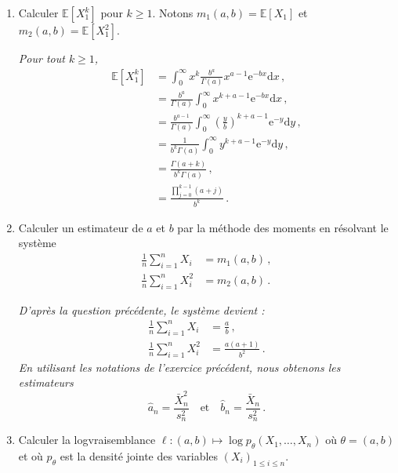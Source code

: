 \documentclass[a4paper,10pt,fleqn]{article}
\newcommand{\1}{\ensuremath{\mathbbm{1}}}
\begin{document}
\begin{enumerate}
\item Calculer $\mathbb{E}[X_1^k]$ pour $k\geq 1$. Notons $m_1(a,b) = \mathbb{E}[X_1]$ et $m_2(a,b) = \mathbb{E}[X^2_1]$.

\vspace{.2cm}

{\em Pour tout $k\geq 1$,
\begin{align*}
\mathbb{E}[X_1^k] &= \int_0^\infty x^k \frac{b^a}{\Gamma(a)}x^{a-1}\mathrm{e}^{-b x} \mathrm{d} x\,,\\
&= \frac{b^a}{\Gamma(a)}\int_0^\infty x^{k+a-1}\mathrm{e}^{-b x} \mathrm{d} x\,,\\
&= \frac{b^{a-1}}{\Gamma(a)}\int_0^\infty \left(\frac{y}{b}\right)^{k+a-1}\mathrm{e}^{-y} \mathrm{d} y\,,\\
&= \frac{1}{b^k\Gamma(a)}\int_0^\infty y^{k+a-1}\mathrm{e}^{-y} \mathrm{d} y\,,\\
&= \frac{\Gamma(a+k)}{b^k\Gamma(a)}\,,\\
&= \frac{\prod_{j=0}^{k-1}(a+j)}{b^k}\,.
\end{align*}}

 \item Calculer un estimateur de $a$ et $b$ par la m\'ethode des moments en r\'esolvant le syst\`eme
\begin{align*}
\frac{1}{n}\sum_{i=1}^nX_i &= m_1(a,b) \,,\\
\frac{1}{n}\sum_{i=1}^nX^2_i &= m_2(a,b) \,.
\end{align*}

\vspace{.2cm}

{\em D'apr\`es la question pr\'ec\'edente, le syst\`eme devient :
\begin{align*}
\frac{1}{n}\sum_{i=1}^nX_i &= \frac{a}{b}\,,\\
\frac{1}{n}\sum_{i=1}^nX^2_i &= \frac{a(a+1)}{b^2} \,.
\end{align*}
En utilisant les notations de l'exercice pr\'ec\'edent, nous obtenons les estimateurs 
$$
\widehat{a}_n = \frac{\bar X_n^2}{s_n^2}\quad\mathrm{et}\quad \widehat{b}_n = \frac{\bar X_n}{s_n^2}\,.
$$
}

\item Calculer la logvraisemblance $\ell : (a,b) \mapsto \log p_\theta (X_1,\ldots,X_n)$ o\`u $\theta = (a,b)$ et o\`u $p_\theta$ est la densit\'e jointe des variables $(X_i)_{1\leq i \leq n}$.

\vspace{.2cm}


\end{enumerate}
\end{document}
